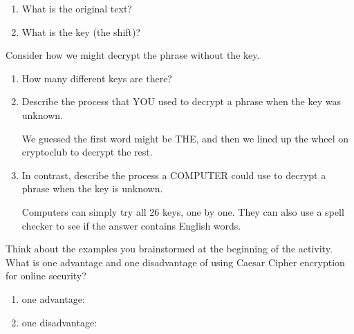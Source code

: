 \begin{enumerate}
\setlength\itemsep{1em}

\item What is the original text?

\item What is the key (the shift)?

\end{enumerate}


\Q Consider how we might decrypt the phrase without the key.

\begin{enumerate}

\item How many different keys are there?


\item Describe the process that YOU used to decrypt a phrase when the key was unknown.

\begin{answer}
We guessed the first word might be THE, and then we lined up the wheel on cryptoclub to decrypt the rest.
\end{answer}

\item In contrast, describe the process a COMPUTER could use to decrypt a phrase when the key is unknown.

\begin{answer}
Computers can simply try all 26 keys, one by one.
They can also use a spell checker to see if the answer contains English words.
\end{answer}

\end{enumerate}


\Q Think about the examples you brainstormed at the beginning of the activity.
What is one advantage and one disadvantage of using Caesar Cipher encryption for online security?

\begin{enumerate}
\setlength\itemsep{1em}

\item one advantage: 

\item one disadvantage: 

\end{enumerate}

